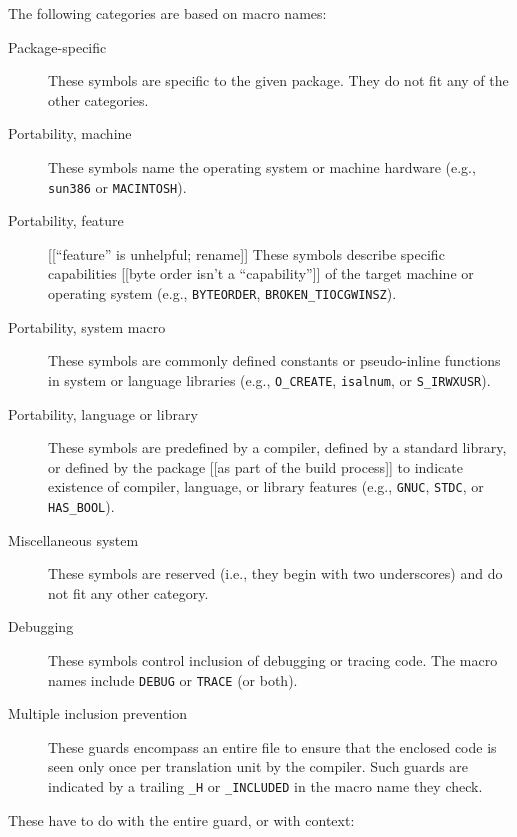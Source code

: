 The following categories are based on macro names:

\begin{description}

\item[Package-specific] 
  These symbols are specific to the given package.  They do not fit any of
  the other categories.

\item[Portability, machine]
  These symbols name the operating system or machine
  hardware (e.g., \texttt{sun386} or \texttt{MACINTOSH}).
      
\item[Portability, feature]
  [[``feature'' is unhelpful; rename]] These symbols describe specific
  capabilities [[byte order isn't a ``capability'']] of the target machine
  or operating system (e.g., \texttt{BYTEORDER}, \verb|BROKEN_TIOCGWINSZ|).

\item[Portability, system macro]
  These symbols are commonly defined constants or
  pseudo-inline functions in system or language libraries (e.g.,
  \verb|O_CREATE|, \texttt{isalnum}, or \verb|S_IRWXUSR|).

\item[Portability, language or library]
  These symbols are predefined by a compiler, defined by a standard
  library, or defined by the package [[as part of the build
  process]] to indicate existence of compiler, language, or library features
  (e.g., \texttt{GNUC}, \texttt{STDC}, or \verb|HAS_BOOL|).

\item[Miscellaneous system]
  These symbols are reserved (i.e., they begin with two underscores) and do
  not fit any other category.
      
\item[Debugging]
  These symbols control inclusion of debugging or tracing code.  The macro
  names include \texttt{DEBUG} or \texttt{TRACE} (or both).
      
\item[Multiple inclusion prevention]
  These guards encompass an entire file to ensure that the enclosed code is
  seen only once per translation unit by the compiler.  Such guards are
  indicated by a trailing \verb|_H| or \verb|_INCLUDED| in the macro name
  they check.
\end{description}


These have to do with the entire guard, or with context:

